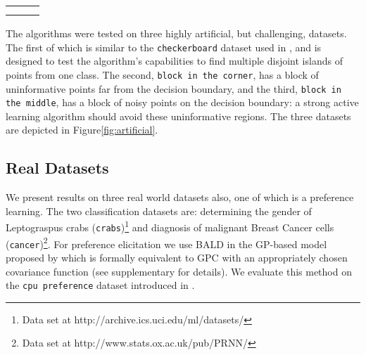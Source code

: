 \documentclass[twoside]{article}
\begin{document}
\begin{figure*}[t]
\begin{center}
\begin{tabular}{rrr}
&
&
\\
&
&
\\
\end{tabular}
\end{center}
\caption{\emph{Top:} Artificial datasets used in our evaluation of active learning methods. Exemplars of the two classes are shown with black squares (\ref{plots:positives}) and red circles(\ref{plots:negatives}). \emph{Bottom:} Results of active learning with seven methods: random query (\ref{plots:rand}), BALD (\ref{plots:BALD}),  maximum entropy sampling (\ref{plots:maxent}), query by committee with the vote criterion with 2 ($\mbox{QBC}_2$, \ref{plots:QBC2}) and 100 ($\mbox{QBC}_{100}$, \ref{plots:QBC100}) committee members, active SVM (\ref{plots:SVM}) and IVM (\ref{plots:IVM}).}
\label{fig:artificial}
\end{figure*}

The algorithms were tested on three highly artificial, but challenging, datasets. The first of which is similar to the \texttt{checkerboard} dataset used in \cite{chu2005preference}, and is designed to test the algorithm's capabilities to find multiple disjoint islands of points from one class. The second, \texttt{block in the corner}, has a block of uninformative points far from the decision boundary, and the third, \texttt{block in the middle}, has a block of noisy points on the decision boundary: a strong active learning algorithm should avoid these uninformative regions. The three datasets are depicted in Figure\ref{fig:artificial}.

\subsection{Real Datasets}

We present results on three real world datasets also, one of which is a preference learning. The two classification datasets are: determining the gender of Leptograspus crabs (\texttt{crabs})\footnote{Data set at http://archive.ics.uci.edu/ml/datasets/} and diagnosis of malignant Breast Cancer cells (\texttt{cancer})\footnote{Data set at http://www.stats.ox.ac.uk/pub/PRNN/}. For preference elicitation we use BALD in the GP-based model proposed by \cite{chu2005preference} which is formally equivalent to GPC with an appropriately chosen covariance function (see supplementary for details). We evaluate this method on the \texttt{cpu preference} dataset introduced in \cite{chu2005preference}.
\end{document}
